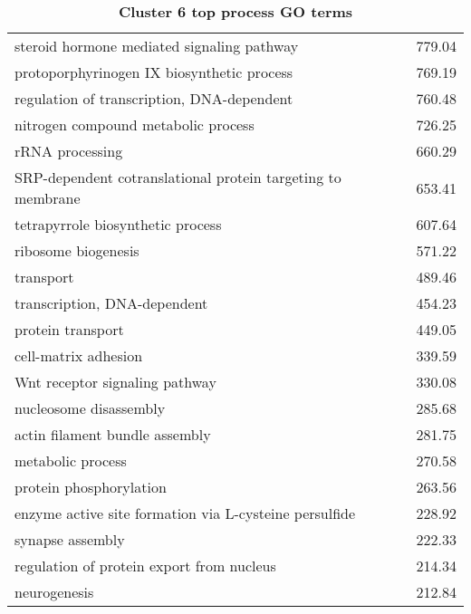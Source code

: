 \begin{table}[hp]
\begin{center}
\begin{tabular}{p{}r}
steroid hormone mediated signaling pathway                              & 779.04                      \\
protoporphyrinogen IX biosynthetic process                              & 769.19                      \\
regulation of transcription, DNA-dependent                              & 760.48                      \\
nitrogen compound metabolic process                                     & 726.25                      \\
rRNA processing                                                         & 660.29                      \\
SRP-dependent cotranslational protein targeting to membrane             & 653.41                      \\
tetrapyrrole biosynthetic process                                       & 607.64                      \\
ribosome biogenesis                                                     & 571.22                      \\
transport                                                               & 489.46                      \\
transcription, DNA-dependent                                            & 454.23                      \\
protein transport                                                       & 449.05                      \\
cell-matrix adhesion                                                    & 339.59                      \\
Wnt receptor signaling pathway                                          & 330.08                      \\
nucleosome disassembly                                                  & 285.68                      \\
actin filament bundle assembly                                          & 281.75                      \\
metabolic process                                                       & 270.58                      \\
protein phosphorylation                                                 & 263.56                      \\
enzyme active site formation via L-cysteine persulfide                  & 228.92                      \\
synapse assembly                                                        & 222.33                      \\
regulation of protein export from nucleus                               & 214.34                      \\
neurogenesis                                                            & 212.84                      \\ \bottomrule
\end{tabular}
\end{center}

\caption[Cluster 6 top process GO terms]{\sf \textbf{Cluster 6 top process GO terms}}
\label{tab:cls6-process}
\end{table}